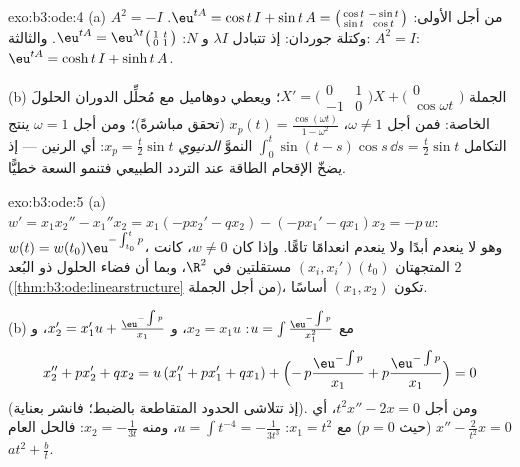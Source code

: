 \begin{solution}{exo:b3:ode:4}
(a) $A^2 = -I$ من أجل الأولى: $\eu^{tA} = \cos t\,I + \sin
t\,A = \bigl(\begin{smallmatrix}\cos t & -\sin t\\ \sin t &
\cos t\end{smallmatrix}\bigr)$. وكتلة جوردان: إذ تتبادل
$\lambda I$ و $N$: $\eu^{tA} =
\eu^{\lambda t}\bigl(\begin{smallmatrix}1 & t\\ 0 &
1\end{smallmatrix}\bigr)$. والثالثة: $A^2 = I$: $\eu^{tA} =
\cosh t\,I + \sinh t\,A$.

(b) الجملة $X' = \bigl(\begin{smallmatrix}0&1\\-1&0
\end{smallmatrix}\bigr)X + \bigl(\begin{smallmatrix}0\\
\cos\omega t\end{smallmatrix}\bigr)$؛ ويعطي دوهاميل مع مُحلِّل الدوران الحلولَ
الخاصة: فمن أجل $\omega \neq 1$، $x_p(t) = \frac{\cos(\omega t)}{1 -
\omega^2}$ (تحقق مباشرةً)؛ ومن أجل
$\omega = 1$ ينتج التكامل $\int_0^t\sin(t - s)\cos s\,\dd s = \frac t2\sin t$ النموَّ \emph{الدنيوي} $x_p = \frac t2\sin t$:
أي الرنين --- إذ يضخّ الإقحام الطاقة عند التردد الطبيعي فتنمو
السعة خطيًّا.
\end{solution}

\begin{solution}{exo:b3:ode:5}
(a) $w' = x_1x_2'' - x_1''x_2 = x_1(-px_2' - qx_2) - (-px_1'
- qx_1)x_2 = -p\,w$: $w(t) = w(t_0)\eu^{-\int_{t_0}^tp}$، وهو لا ينعدم أبدًا ولا ينعدم انعدامًا
تامًّا. وإذا كان $w \neq 0$، كانت المتجهتان $(x_i, x_i')(t_0)$ مستقلتين في
$\R^2$، وبما أن فضاء الحلول ذو البُعد $2$ (\cref{thm:b3:ode:linearstructure} من أجل
الجملة)، تكون $(x_1,
x_2)$ أساسًا.

(b) مع $u = \int\frac{\eu^{-\int p}}{x_1^2}$: $x_2 = x_1u$، و $x_2' = x_1'u + \frac{\eu^{-\int p}}{x_1}$، و
\[
x_2'' + px_2' + qx_2
= u\,(x_1'' + px_1' + qx_1) +
\Bigl(-\,p\frac{\eu^{-\int p}}{x_1} +
p\frac{\eu^{-\int p}}{x_1}\Bigr) = 0
\]
(إذ تتلاشى الحدود المتقاطعة بالضبط؛ فانشر بعناية). ومن أجل
$t^2x'' - 2x = 0$، أي $x'' - \frac2{t^2}x = 0$ (حيث $p = 0$) مع $x_1 = t^2$: $u = \int t^{-4} = -\frac1{3t^3}$، ومنه
$x_2
= -\frac1{3t}$: فالحل العام $at^2 + \frac bt$.
\end{solution}

